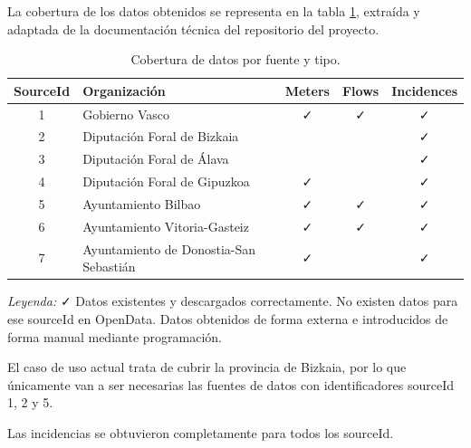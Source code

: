 La cobertura de los datos obtenidos se representa en la tabla \ref{tab:cobertura_datos_opendata}, extraída y adaptada de la documentación técnica del repositorio del proyecto.

\begin{table}[H]
	\centering
	\caption{Cobertura de datos por fuente y tipo.}
	\label{tab:cobertura_datos_opendata}
	\begin{tabular}{|c|l|c|c|c|}
		\hline
		\textbf{SourceId} & \textbf{Organización}              & \textbf{Meters} & \textbf{Flows} & \textbf{Incidences} \\ \hline
			1	& Gobierno Vasco 				 			& \textcolor{mygreen}{\faCheck} & \textcolor{mygreen}{\faCheck} & \textcolor{mygreen}{\faCheck} \\ \hline
			2   & Diputación Foral de Bizkaia 	 			& \faHandPaper & \faHandPaper & \textcolor{mygreen}{\faCheck} \\ \hline
			3   & Diputación Foral de Álava		 			& \textcolor{myred}{\faTimes} & \textcolor{myred}{\faTimes} & \textcolor{mygreen}{\faCheck} \\ \hline
			4   & Diputación Foral de Gipuzkoa   			& \textcolor{mygreen}{\faCheck} & \textcolor{myred}{\faTimes} & \textcolor{mygreen}{\faCheck} \\ \hline
			5   & Ayuntamiento Bilbao 			 			& \textcolor{mygreen}{\faCheck} & \textcolor{mygreen}{\faCheck} & \textcolor{mygreen}{\faCheck} \\ \hline
			6   & Ayuntamiento Vitoria-Gasteiz   			& \textcolor{mygreen}{\faCheck} & \textcolor{mygreen}{\faCheck} & \textcolor{mygreen}{\faCheck} \\ \hline
			7   & Ayuntamiento de Donostia-San Sebastián	& \textcolor{mygreen}{\faCheck} & \textcolor{myred}{\faTimes} & \textcolor{mygreen}{\faCheck} \\ \hline
	\end{tabular}
\end{table}

\textit{Leyenda:} 
\textcolor{mygreen}{\faCheck} Datos existentes y descargados correctamente. 
\textcolor{myred}{\faTimes} No existen datos para ese sourceId en OpenData.
\faHandPaper Datos obtenidos de forma externa e introducidos de forma manual mediante programación.

El caso de uso actual trata de cubrir la provincia de Bizkaia, por lo que únicamente van a ser necesarias las fuentes de datos con identificadores sourceId 1, 2 y 5.

Las incidencias se obtuvieron completamente para todos los sourceId.


